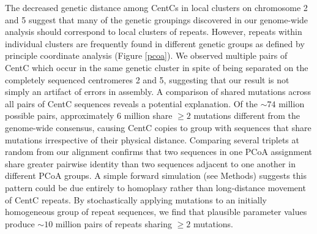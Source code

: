 The decreased genetic distance among CentCs in local clusters on chromosome 2 and 5 suggest that many of the genetic groupings discovered in our genome-wide analysis should correspond to local clusters of repeats. 
However, repeats within individual clusters are frequently found in different genetic groups as defined by principle coordinate analysis (Figure \ref{pcoa}).
We observed multiple pairs of CentC which occur in the same genetic cluster in spite of being separated on the completely sequenced centromeres 2 and 5, suggesting that our result is not simply an artifact of errors in assembly.
A comparison of shared mutations across all pairs of CentC sequences reveals a potential explanation.  
Of the $\sim 74$ million possible pairs,  approximately 6 million share $\geq 2$ mutations different from the genome-wide consensus, causing CentC copies to group with sequences that share mutations irrespective of their physical distance.  
Comparing several triplets at random from our alignment confirms that two sequences in one PCoA assignment share greater pairwise identity than two sequences adjacent to one another in different PCoA groups.  
A simple forward simulation (see Methods) suggests this pattern could be due entirely to homoplasy rather than long-distance movement of CentC repeats.  
By stochastically applying mutations to an initially homogeneous group of repeat sequences, we find that plausible parameter values produce $\sim 10$ million pairs of repeats sharing $\geq 2$ mutations.

